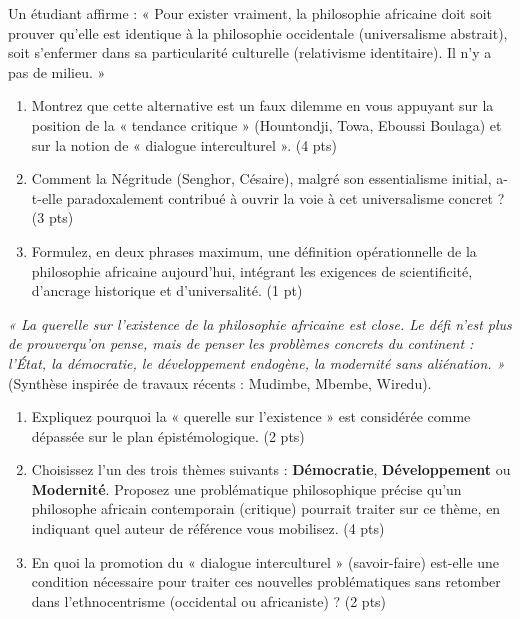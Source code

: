 \documentclass[11pt]{article}
\begin{document}
\begin{exercice}
Un étudiant affirme : « Pour exister vraiment, la philosophie africaine doit soit prouver qu'elle est identique à la philosophie occidentale (universalisme abstrait), soit s'enfermer dans sa particularité culturelle (relativisme identitaire). Il n'y a pas de milieu. »
\begin{enumerate}
    \item Montrez que cette alternative est un faux dilemme en vous appuyant sur la position de la « tendance critique » (Hountondji, Towa, Eboussi Boulaga) et sur la notion de « dialogue interculturel ». (4 pts)
    \item Comment la Négritude (Senghor, Césaire), malgré son essentialisme initial, a-t-elle paradoxalement contribué à ouvrir la voie à cet universalisme concret ? (3 pts)
    \item Formulez, en deux phrases maximum, une définition opérationnelle de la philosophie africaine aujourd'hui, intégrant les exigences de scientificité, d'ancrage historique et d'universalité. (1 pt)
\end{enumerate}
\end{exercice}

\begin{exercice}
\textit{« La querelle sur l'existence de la philosophie africaine est close. Le défi n'est plus de \og prouver\fg qu'on pense, mais de penser les problèmes concrets du continent : l'État, la démocratie, le développement endogène, la modernité sans aliénation. »} (Synthèse inspirée de travaux récents : Mudimbe, Mbembe, Wiredu).
\begin{enumerate}
    \item Expliquez pourquoi la « querelle sur l'existence » est considérée comme dépassée sur le plan épistémologique. (2 pts)
    \item Choisissez l'un des trois thèmes suivants : \textbf{Démocratie}, \textbf{Développement} ou \textbf{Modernité}. Proposez une problématique philosophique précise qu'un philosophe africain contemporain (critique) pourrait traiter sur ce thème, en indiquant quel auteur de référence vous mobilisez. (4 pts)
    \item En quoi la promotion du « dialogue interculturel » (savoir-faire) est-elle une condition nécessaire pour traiter ces nouvelles problématiques sans retomber dans l'ethnocentrisme (occidental ou africaniste) ? (2 pts)
\end{enumerate}
\end{exercice}
\end{document}
